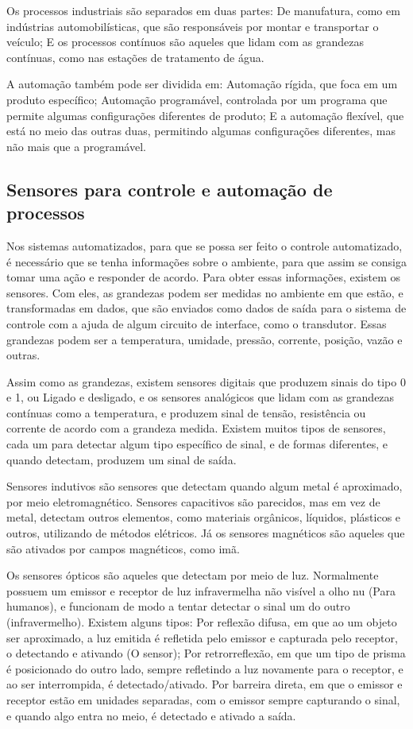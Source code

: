 \documentclass{article}
\begin{document}
Os processos industriais são separados em duas partes: De manufatura, como em indústrias automobilísticas, que são responsáveis por montar e transportar o veículo; E os processos contínuos são aqueles que lidam com as grandezas contínuas, como nas estações de tratamento de água. 

A automação também pode ser dividida em: Automação rígida, que foca em um produto específico; Automação programável, controlada por um programa que permite algumas configurações diferentes de produto; E a automação flexível, que está no meio das outras duas, permitindo algumas configurações diferentes, mas não mais que a programável.

\subsection{Sensores para controle e automação de processos}

Nos sistemas automatizados, para que se possa ser feito o controle automatizado, é necessário que se tenha informações sobre o ambiente, para que assim se consiga tomar uma ação e responder de acordo. Para obter essas informações, existem os sensores. Com eles, as grandezas podem ser medidas no ambiente em que estão, e transformadas em dados, que são enviados como dados de saída para o sistema de controle com a ajuda de algum circuito de interface, como o transdutor. Essas grandezas podem ser a temperatura, umidade, pressão, corrente, posição, vazão e outras. 

Assim como as grandezas, existem sensores digitais que produzem sinais do tipo 0 e 1, ou Ligado e desligado, e os sensores analógicos que lidam com as grandezas contínuas como a temperatura, e produzem sinal de tensão, resistência ou corrente de acordo com a grandeza medida. Existem muitos tipos de sensores, cada um para detectar algum tipo específico de sinal, e de formas diferentes, e quando detectam, produzem um sinal de saída. 

Sensores indutivos são sensores que detectam quando algum metal é aproximado, por meio eletromagnético. Sensores capacitivos são parecidos, mas em vez de metal, detectam outros elementos, como materiais orgânicos, líquidos, plásticos e outros, utilizando de métodos elétricos. Já os sensores magnéticos são aqueles que são ativados por campos magnéticos, como imã. 

 

Os sensores ópticos são aqueles que detectam por meio de luz. Normalmente possuem um emissor e receptor de luz infravermelha não visível a olho nu (Para humanos), e funcionam de modo a tentar detectar o sinal um do outro (infravermelho). Existem alguns tipos: Por reflexão difusa, em que ao um objeto ser aproximado, a luz emitida é refletida pelo emissor e capturada pelo receptor, o detectando e ativando (O sensor); Por retrorreflexão, em que um tipo de prisma é posicionado do outro lado, sempre refletindo a luz novamente para o receptor, e ao ser interrompida, é detectado/ativado. Por barreira direta, em que o emissor e receptor estão em unidades separadas, com o emissor sempre capturando o sinal, e quando algo entra no meio, é detectado e ativado a saída. 
\end{document}
